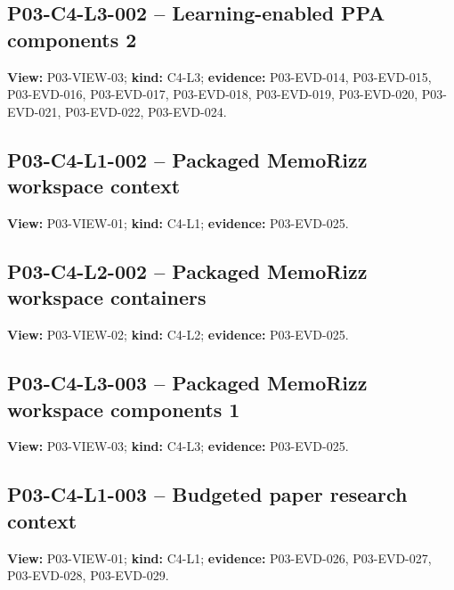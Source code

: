 \documentclass[10pt,letterpaper]{article}
\begin{document}
\subsection{P03-C4-L3-002 -- Learning-enabled PPA components 2}
\textbf{View:} P03-VIEW-03; \textbf{kind:} C4-L3; \textbf{evidence:} P03-EVD-014, P03-EVD-015, P03-EVD-016, P03-EVD-017, P03-EVD-018, P03-EVD-019, P03-EVD-020, P03-EVD-021, P03-EVD-022, P03-EVD-024.\par
{}
\clearpage

\subsection{P03-C4-L1-002 -- Packaged MemoRizz workspace context}
\textbf{View:} P03-VIEW-01; \textbf{kind:} C4-L1; \textbf{evidence:} P03-EVD-025.\par
{}
\clearpage

\subsection{P03-C4-L2-002 -- Packaged MemoRizz workspace containers}
\textbf{View:} P03-VIEW-02; \textbf{kind:} C4-L2; \textbf{evidence:} P03-EVD-025.\par
{}
\clearpage

\subsection{P03-C4-L3-003 -- Packaged MemoRizz workspace components 1}
\textbf{View:} P03-VIEW-03; \textbf{kind:} C4-L3; \textbf{evidence:} P03-EVD-025.\par
{}
\clearpage

\subsection{P03-C4-L1-003 -- Budgeted paper research context}
\textbf{View:} P03-VIEW-01; \textbf{kind:} C4-L1; \textbf{evidence:} P03-EVD-026, P03-EVD-027, P03-EVD-028, P03-EVD-029.\par
{}
\clearpage
\end{document}
